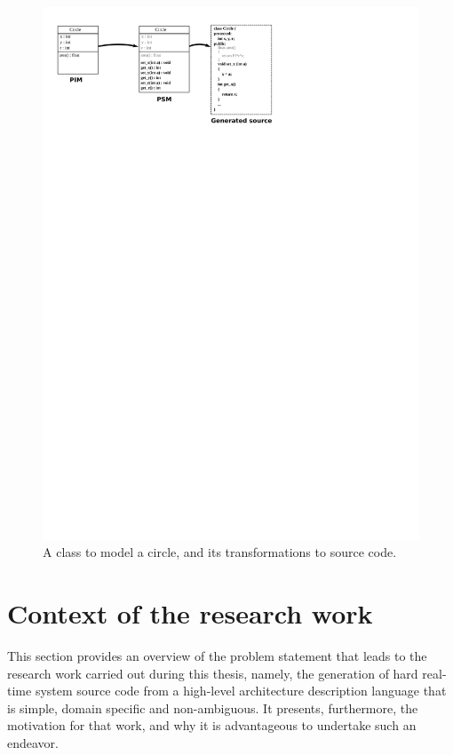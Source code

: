 \begin{figure}
\centering
\includegraphics{figs/class}
\caption{A class to model a circle, and its transformations to source
  code.}
\label{fig:class}
\end{figure}

\section{Context of the research work}
This section provides an overview of the problem statement that leads
to the research work carried out during this thesis, namely, the
generation of hard real-time system source code from a high-level
architecture description language that is simple, domain specific and
non-ambiguous. It presents, furthermore, the motivation for that work,
and why it is advantageous to undertake such an endeavor.

